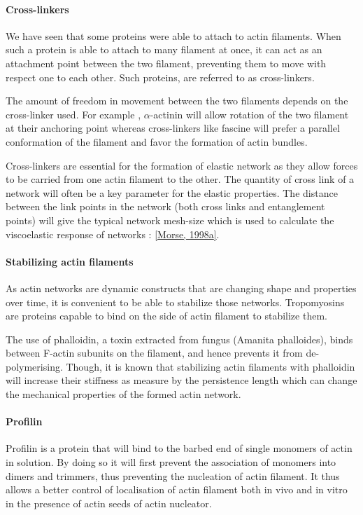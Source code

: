 \documentclass[A4paperpaper,11pt,english]{sphinxmanual}
\begin{document}
\paragraph{Cross-linkers}
\label{index-latex:cross-linkers}
We have seen that some proteins were able to attach to actin filaments. When
such a protein is able to attach to many filament at once, it can act as an
attachment point between the two filament, preventing them to move with respect
one to each other. Such proteins, are referred to as cross-linkers.

The amount of freedom in movement between the two filaments depends on the
cross-linker used. For example , \(\alpha\)-actinin will allow rotation of the two
filament at their anchoring point whereas cross-linkers like fascine will prefer
a parallel conformation of the filament and favor the formation of actin
bundles.

Cross-linkers are essential for the formation of elastic network as they allow
forces to be carried from one actin filament to the other. The quantity of
cross link of a network will often be a key parameter for the elastic properties.
The distance between the link points in the network (both cross links
and entanglement points) will give the typical network mesh-size which is used
to calculate the viscoelastic response of networks : {\hyperref[index-latex:morse1998a]{{[}Morse,  1998a{]}}}.


\paragraph{Stabilizing actin filaments}
\label{index-latex:stabilizing-actin-filaments}
As actin networks are dynamic constructs that are changing shape and properties
over time, it is convenient to be able to stabilize those networks. Tropomyosins
are proteins capable to bind on the side of actin filament to stabilize them.

The use of phalloidin, a toxin extracted from fungus (Amanita phalloides), binds
between F-actin subunits on the filament, and hence  prevents it from
de-polymerising.  Though, it is known that stabilizing actin filaments with
phalloidin will increase their stiffness as measure by the persistence length which can change the
mechanical properties of the formed actin network.


\paragraph{Profilin}
\label{index-latex:profilin}
Profilin is a protein that will bind to the barbed end of single monomers of
actin in solution.  By doing so it will first prevent the association of
monomers into dimers and trimmers, thus preventing the nucleation of actin
filament. It thus allows a better control of localisation of actin filament
both in vivo and in vitro in the presence of actin seeds of actin nucleator.
\end{document}
